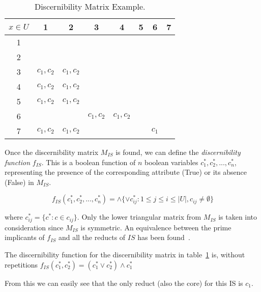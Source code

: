 \documentclass[authoryear,11pt]{elsarticle}
\begin{document}
   \begin{table}[htb]
		\caption{Discernibility Matrix Example.} \label{tab_DM}
		\centering
 	\begin{tabular}{c|ccccccc}
 		$x \in U$ & 1 & 2 &  3 & 4 & 5 &  6 & 7\\
 		\hline
		1 &&&&&&&\\
		2 &&&&&&&\\
		3 & $c_1,c_2$ & $c_1,c_2$ &&&&&\\
		4 & $c_1,c_2$ & $c_1,c_2$ &&&&&\\
		5 & $c_1,c_2$ & $c_1,c_2$ &&&&&\\
		6 &&& $c_1,c_2$ & $c_1,c_2$ &&&\\
		7 & $c_1,c_2$ & $c_1,c_2$ &&&& $c_1$ &\\
 	\end{tabular}             
 \end{table}
  
  Once the discernibility matrix $M_{IS}$ is found, we can define the \textit{discernibility function} $f_{IS}$.
  This is a boolean function of $n$ boolean variables $c_1^*, c_2^*,...,c_n^*$, representing the presence of
  the corresponding attribute (True) or its absence (False) in $M_{IS}$.
  
  \begin{equation}
  	f_{IS}(c_1^*, c_2^*,...,c_n^*)=\wedge \lbrace \vee c_{ij}^* : 1 \leq j \leq i \leq |U|, 
  									c_{ij} \neq \emptyset \rbrace
  \end{equation}

  where $c_{ij}^*=\lbrace c^* : c \in c_{ij} \rbrace$. Only the lower triangular matrix from $M_{IS}$ is
  taken into consideration since $M_{IS}$ is symmetric. An equivalence between the prime implicants of
  $f_{IS}$ and all the reducts of $IS$ has been found~\citep{Pawlak07}.
  
  The discernibility function for the discernibility matrix in table~\ref{tab_DM} is, without repetitions  
  $f_{IS}(c_1^*,c_2^*)=(c_1^* \vee c_2^*) \wedge c_1^*$
  
  From this we can easily see that the only reduct (also the core) for this IS is $c_1$.
  
\end{document}
